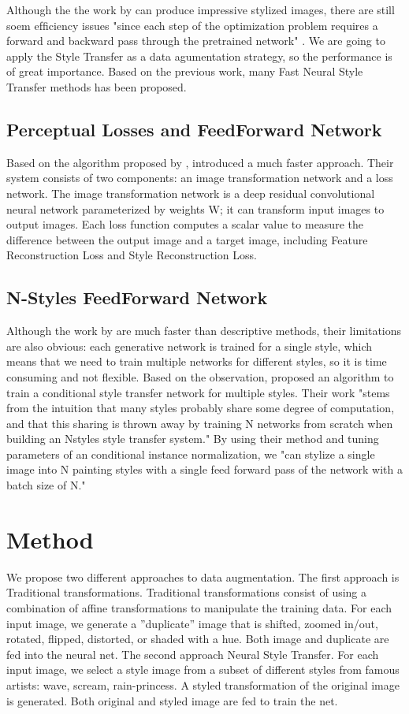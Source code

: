 \documentclass[a4paper,11pt]{article}
\begin{document}
Although the the work by \cite{gatys2016image} can produce impressive stylized images, there are still soem efﬁciency issues "since each step of the optimization problem requires a forward and backward pass through the pretrained network" \cite{johnson2016perceptual}. We are going to apply the Style Transfer as a data agumentation strategy, so the performance is of great importance. Based on the previous work, many Fast Neural Style Transfer methods has been proposed.
\subsection{Perceptual Losses and FeedForward Network}
Based on the algorithm proposed by \cite{gatys2016image}, \cite{johnson2016perceptual} introduced a much faster approach.
Their system consists of two components: an image transformation network and a loss network. The image transformation network is a deep residual convolutional neural network parameterized by weights W; it can transform input images to output images. Each loss function computes a scalar value to measure the diﬀerence between the output image and a target image, including Feature Reconstruction Loss and Style Reconstruction Loss.
\subsection{N-Styles FeedForward Network}
Although the work by \cite{johnson2016perceptual} are much faster than descriptive methods, their limitations are also obvious: each generative network is trained for a single style, which means that we need to train multiple networks for different styles, so it is time consuming and not flexible. Based on the observation, \cite{dumoulin2016learned} proposed an algorithm to train a conditional style transfer network for multiple styles. Their work "stems from the intuition that many styles probably share some degree of computation, and that this sharing is thrown away by training N networks from scratch when building an Nstyles style transfer system."
By using their method and tuning parameters of an conditional instance normalization, we "can stylize a single image into N painting styles with a single feed forward pass of the network with a batch size of N." 

\section{Method}
We propose two different approaches to data augmentation. The first approach is Traditional transformations. Traditional transformations consist of using a combination of affine transformations to manipulate the training data. For each input image, we generate a ”duplicate” image that is shifted, zoomed in/out, rotated, flipped, distorted, or shaded with a hue. Both image and duplicate are fed into the neural net. The second approach Neural Style Transfer. For each input image, we select a style image from a subset of different styles from famous artists: wave, scream, rain-princess. A styled transformation of the original image is generated. Both original and styled image are fed to train the net.
\end{document}
